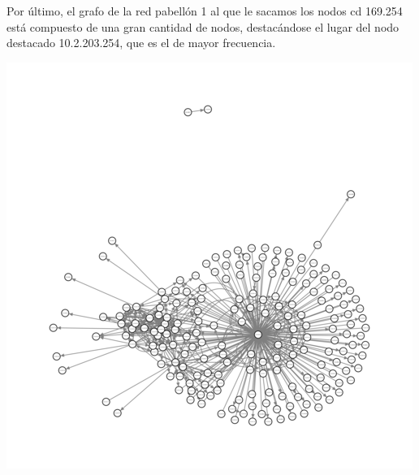 Por último, el grafo de la red pabellón 1 al que le sacamos los nodos
cd 169.254 está compuesto de una gran cantidad de nodos, destacándose
el lugar del nodo destacado 10.2.203.254, que es el de mayor
frecuencia.

\includegraphics{../img/exactas-sin169.png}

